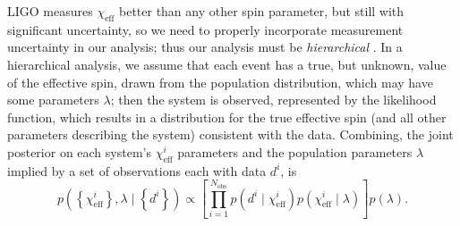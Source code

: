 \documentclass[modern,linenumbers]{aastex61}
\newcommand{\chieff}{\chi_\mathrm{eff}}
\begin{document}
LIGO measures $\chieff$ better than any other spin parameter, but
still with significant uncertainty, so we need to properly incorporate
measurement uncertainty in our analysis; thus our analysis must be
\emph{hierarchical} \citep{2010ApJ...725.2166H,2010PhRvD..81h4029M}.
In a hierarchical analysis, we assume that each event has a true, but
unknown, value of the effective spin, drawn from the population
distribution, which may have some parameters $\lambda$; then the
system is observed, represented by the likelihood function, which
results in a distribution for the true effective spin (and all other
parameters describing the system) consistent with the data.
Combining, the joint posterior on each system's $\chieff^i$ parameters
and the population parameters $\lambda$ implied by a set of
observations each with data $d^i$, is
\begin{equation}
  p\left( \left\{ \chieff^i \right\}, \lambda \mid \left\{ d^i \right\} \right) \propto \left[ \prod_{i=1}^{N_\mathrm{obs}} p\left(d^i \mid \chieff^i \right) p\left( \chieff^i \mid \lambda \right) \right] p\left(\lambda\right).
\end{equation}
\end{document}
